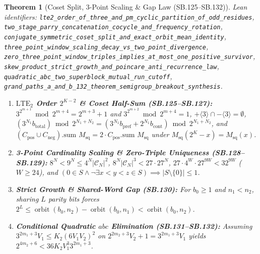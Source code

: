 \documentclass[11pt]{article}
\newtheorem{theorem}{Theorem}[section]
\begin{document}
\begin{theorem}[Coset Split, 3-Point Scaling \& Gap Law (SB.125--SB.132)]
\emph{Lean identifiers:} \nolinkurl{lte2_order_of_three_and_pm_cyclic_partition_of_odd_residues}, \nolinkurl{two_stage_parry_concatenation_cocycle_and_frequency_rotation}, \nolinkurl{conjugate_symmetric_coset_split_and_exact_orbit_mean_identity}, \nolinkurl{three_point_window_scaling_decay_vs_two_point_divergence}, \nolinkurl{zero_three_point_window_triples_implies_at_most_one_positive_survivor}, \nolinkurl{skew_product_strict_growth_and_poincare_anti_recurrence_law}, \nolinkurl{quadratic_abc_two_superblock_mutual_run_cutoff}, \nolinkurl{grand_paths_a_and_b_132_theorem_semigroup_breakout_synthesis}.
\begin{enumerate}
  \item \textbf{$\text{LTE}_2$ Order $2^{K-2}$ \& Coset Half-Sum (SB.125--SB.127):} $3^{2^{m+1}} \bmod 2^{m+4} = 2^{m+3} + 1$ and $3^{2^{m+2}} \bmod 2^{m+4} = 1$, $+\langle 3 \rangle \cap -\langle 3 \rangle = \emptyset$, $(3^{N_1} b_{\text{total}}) \bmod 2^{N_1+N_2} = (3^{N_1} b_{\text{pref}} + 2^{N_1} b_{\text{cont}}) \bmod 2^{N_1+N_2}$, and $(C_{\text{pos}} \cup C_{\text{neg}}).\text{sum } M_{\text{sq}} = 2 \cdot C_{\text{pos}}.\text{sum } M_{\text{sq}}$ under $M_{\text{sq}}(2^K - x) = M_{\text{sq}}(x)$.
  \item \textbf{3-Point Cardinality Scaling \& Zero-Triple Uniqueness (SB.128--SB.129):} $8^N < 9^N \le 4^N |\mathcal{C}_N|^2$, $8^N |\mathcal{C}_N|^3 < 27 \cdot 27^N$, $27 \cdot 4^W \cdot 27^{9W} < 32^{9W}$ ($W \ge 24$), and $(0 \in S \wedge \neg\exists x < y < z \in S) \implies |S \setminus \{0\}| \le 1$.
  \item \textbf{Strict Growth \& Shared-Word Gap (SB.130):} For $b_0 \ge 1$ and $n_1 < n_2$, sharing $L$ parity bits forces $2^L \le \operatorname{orbit}(b_0, n_2) - \operatorname{orbit}(b_0, n_1) < \operatorname{orbit}(b_0, n_2)$.
  \item \textbf{Conditional Quadratic $abc$ Elimination (SB.131--SB.132):} Assuming $3^{2m_1+3} V_1 \le K_2(6 V_1 V_2)^2$ on $2^{2m_2+3} V_2 + 1 = 3^{2m_1+3} V_1$ yields $2^{4m_2+6} < 36 K_2 V_1^3 3^{2m_1+3}$.
\end{enumerate}
\end{theorem}
\end{document}
